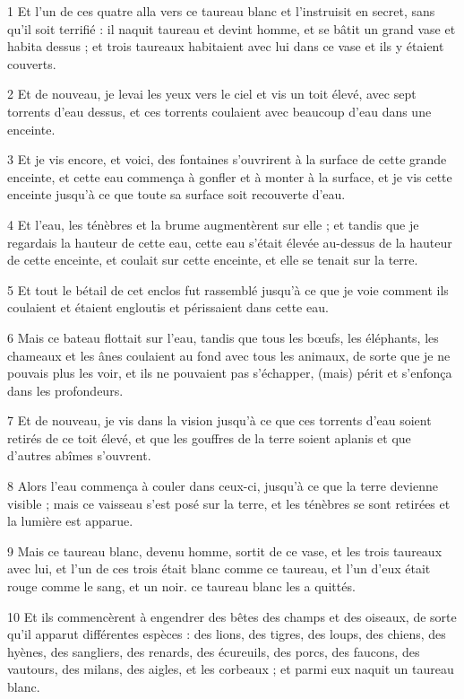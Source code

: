 \par 1 Et l'un de ces quatre alla vers ce taureau blanc et l'instruisit en secret, sans qu'il soit terrifié : il naquit taureau et devint homme, et se bâtit un grand vase et habita dessus ; et trois taureaux habitaient avec lui dans ce vase et ils y étaient couverts.
\par 2 Et de nouveau, je levai les yeux vers le ciel et vis un toit élevé, avec sept torrents d'eau dessus, et ces torrents coulaient avec beaucoup d'eau dans une enceinte.
\par 3 Et je vis encore, et voici, des fontaines s'ouvrirent à la surface de cette grande enceinte, et cette eau commença à gonfler et à monter à la surface, et je vis cette enceinte jusqu'à ce que toute sa surface soit recouverte d'eau.
\par 4 Et l'eau, les ténèbres et la brume augmentèrent sur elle ; et tandis que je regardais la hauteur de cette eau, cette eau s'était élevée au-dessus de la hauteur de cette enceinte, et coulait sur cette enceinte, et elle se tenait sur la terre.
\par 5 Et tout le bétail de cet enclos fut rassemblé jusqu'à ce que je voie comment ils coulaient et étaient engloutis et périssaient dans cette eau.
\par 6 Mais ce bateau flottait sur l'eau, tandis que tous les bœufs, les éléphants, les chameaux et les ânes coulaient au fond avec tous les animaux, de sorte que je ne pouvais plus les voir, et ils ne pouvaient pas s'échapper, (mais) périt et s'enfonça dans les profondeurs.
\par 7 Et de nouveau, je vis dans la vision jusqu'à ce que ces torrents d'eau soient retirés de ce toit élevé, et que les gouffres de la terre soient aplanis et que d'autres abîmes s'ouvrent.
\par 8 Alors l'eau commença à couler dans ceux-ci, jusqu'à ce que la terre devienne visible ; mais ce vaisseau s'est posé sur la terre, et les ténèbres se sont retirées et la lumière est apparue.
\par 9 Mais ce taureau blanc, devenu homme, sortit de ce vase, et les trois taureaux avec lui, et l'un de ces trois était blanc comme ce taureau, et l'un d'eux était rouge comme le sang, et un noir. ce taureau blanc les a quittés.
\par 10 Et ils commencèrent à engendrer des bêtes des champs et des oiseaux, de sorte qu'il apparut différentes espèces : des lions, des tigres, des loups, des chiens, des hyènes, des sangliers, des renards, des écureuils, des porcs, des faucons, des vautours, des milans, des aigles, et les corbeaux ; et parmi eux naquit un taureau blanc.
